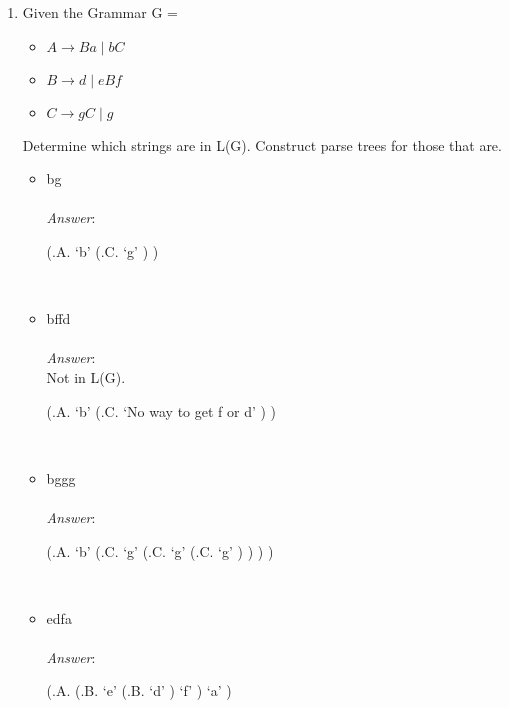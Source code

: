 \documentclass[fleqn]{article}
\begin{document}
\begin{enumerate}
  \item Given the Grammar G =
  \begin{itemize}
    \item $A \rightarrow Ba\; |\; bC$
    \item $B \rightarrow d\; |\; eBf$
    \item $C \rightarrow gC\; |\; g$
  \end{itemize}
  Determine which strings are in L(G). Construct parse trees for those that are.

  \begin{itemize}
    \item bg\\\\
    \textit{Answer}:\\
    \begin{parsetree}
      (.A.
        `b'
        (.C.
          `g'
        )
      )
    \end{parsetree}\\

    \item bffd\\\\
    \textit{Answer}:\\
    Not in L(G).
    \begin{parsetree}
      (.A.
        `b'
        (.C.
          `No way to get f or d'
        )
      )
    \end{parsetree}\\

    \item bggg\\\\
    \textit{Answer}:\\
    \begin{parsetree}
      (.A.
        `b'
        (.C.
          `g'
          (.C.
            `g'
            (.C.
              `g'
            )
          )
        )
      )
    \end{parsetree}\\

    \item edfa\\\\
    \textit{Answer}:\\
    \begin{parsetree}
      (.A.
        (.B.
          `e'
          (.B.
            `d'
          )
          `f'
        )
        `a'
      )
    \end{parsetree}\\


\end{itemize}
\end{enumerate}
\end{document}
